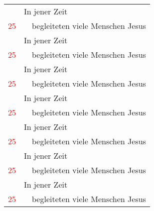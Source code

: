 \documentclass[12pt,ngerman]{scrartcl}
\newcommand{\nummer}[1]{\footnotesize\textcolor{red}{#1}}
\begin{document}
\begin{tabular}{cp{1cm}p{8cm}}
& \multicolumn{2}{l}{In jener Zeit} \\
\nummer{25} & & begleiteten viele Menschen Jesus \\
& \multicolumn{2}{l}{In jener Zeit} \\
\nummer{25} & & begleiteten viele Menschen Jesus \\
& \multicolumn{2}{l}{In jener Zeit} \\
\nummer{25} & & begleiteten viele Menschen Jesus \\
& \multicolumn{2}{l}{In jener Zeit} \\
\nummer{25} & & begleiteten viele Menschen Jesus \\
& \multicolumn{2}{l}{In jener Zeit} \\
\nummer{25} & & begleiteten viele Menschen Jesus \\
& \multicolumn{2}{l}{In jener Zeit} \\
\nummer{25} & & begleiteten viele Menschen Jesus \\
& \multicolumn{2}{l}{In jener Zeit} \\
\nummer{25} & & begleiteten viele Menschen Jesus \\
\end{tabular}
\end{document}
